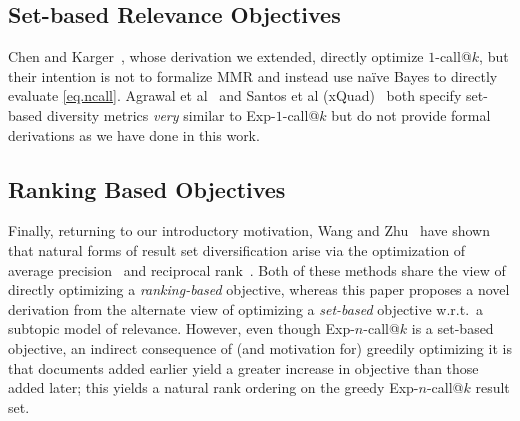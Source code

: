 \subsection{Set-based Relevance Objectives} 

Chen and Karger~\cite{chen06Less}, whose derivation we extended,
directly optimize $1$-call@$k$, but their intention is not to
formalize MMR and instead use na\"{i}ve Bayes to directly evaluate
\eqref{eq.ncall}.  Agrawal et al~\cite{agrawal09diversifying}
and Santos et al (xQuad)~\cite{santos2010xquad} both specify set-based
diversity metrics \emph{very} similar to Exp-$1$-call@$k$ but do not provide
formal derivations as we have done in this work. 

\subsection{Ranking Based Objectives} 

Finally, returning to our introductory motivation, Wang and
Zhu~\cite{wangzhu10} have shown that natural forms of result set
diversification arise via the optimization of average
precision~\cite{ap} and reciprocal rank~\cite{mrr}.  Both of these
methods share the view of directly optimizing a
\emph{ranking-based} objective, whereas this paper proposes a novel
derivation from the alternate view of optimizing a \emph{set-based}
objective w.r.t.\ a subtopic model of relevance.  However, even though
Exp-$n$-call@$k$ is a set-based objective, an indirect consequence of
(and motivation for) greedily optimizing it is that documents added
earlier yield a greater increase in objective than those added later;
this yields a natural rank ordering on the greedy Exp-$n$-call@$k$
result set.


